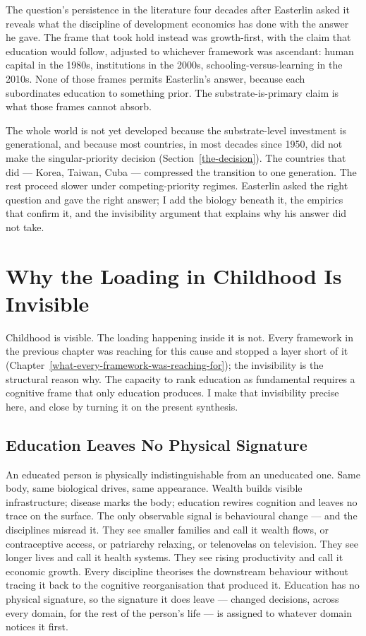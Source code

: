 \documentclass[12pt,letterpaper]{article}
\begin{document}
The question's persistence in the literature four decades after Easterlin asked it reveals what the discipline of development economics has done with the answer he gave. The frame that took hold instead was growth-first, with the claim that education would follow, adjusted to whichever framework was ascendant: human capital in the 1980s, institutions in the 2000s, schooling-versus-learning in the 2010s. None of those frames permits Easterlin's answer, because each subordinates education to something prior. The substrate-is-primary claim is what those frames cannot absorb.

The whole world is not yet developed because the substrate-level investment is generational, and because most countries, in most decades since 1950, did not make the singular-priority decision (Section~\ref{the-decision}). The countries that did --- Korea, Taiwan, Cuba --- compressed the transition to one generation. The rest proceed slower under competing-priority regimes. Easterlin asked the right question and gave the right answer; I add the biology beneath it, the empirics that confirm it, and the invisibility argument that explains why his answer did not take.


\section{Why the Loading in Childhood Is Invisible}\label{why-the-loading-in-childhood-is-invisible}

Childhood is visible. The loading happening inside it is not.
Every framework in the previous chapter was reaching for this
cause and stopped a layer short of it
(Chapter~\ref{what-every-framework-was-reaching-for}); the
invisibility is the structural reason why. The capacity to rank education as fundamental
requires a cognitive frame that only education produces. I make
that invisibility precise here, and close by turning it on the
present synthesis.

\subsection{Education Leaves No Physical Signature}\label{education-leaves-no-physical-signature}

An educated person is physically indistinguishable from an uneducated
one. Same body, same biological drives, same appearance. Wealth builds
visible infrastructure; disease marks the body; education rewires
cognition and leaves no trace on the surface. The only observable signal
is behavioural change --- and the disciplines misread it. They see
smaller families and call it wealth flows, or contraceptive access, or
patriarchy relaxing, or telenovelas on television. They see longer
lives and call it health systems. They see rising productivity and
call it economic growth. Every discipline
theorises the downstream behaviour without tracing it back to the
cognitive reorganisation that produced it. Education has no physical
signature, so the signature it does leave --- changed decisions, across
every domain, for the rest of the person's life --- is assigned to
whatever domain notices it first.
\end{document}
